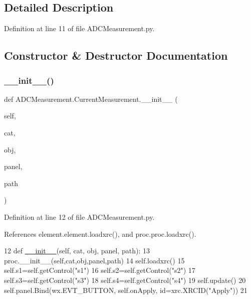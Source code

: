 \subsection{Detailed Description}


Definition at line 11 of file A\+D\+C\+Measurement.\+py.



\subsection{Constructor \& Destructor Documentation}
\mbox{\label{classADCMeasurement_1_1CurrentMeasurement_a0a2d0af1a969198d474d3f1fcd656d87}} 
\subsubsection{\texorpdfstring{\+\_\+\+\_\+init\+\_\+\+\_\+()}{\_\_init\_\_()}}
{\footnotesize\ttfamily def A\+D\+C\+Measurement.\+Current\+Measurement.\+\_\+\+\_\+init\+\_\+\+\_\+ (\begin{DoxyParamCaption}\item[{}]{self,  }\item[{}]{cat,  }\item[{}]{obj,  }\item[{}]{panel,  }\item[{}]{path }\end{DoxyParamCaption})}



Definition at line 12 of file A\+D\+C\+Measurement.\+py.



References element.\+element.\+loadxrc(), and proc.\+proc.\+loadxrc().


\begin{DoxyCode}
12     \textcolor{keyword}{def }\hyperlink{classwrapper_1_1ModuleDictWrapper_a9a7a794150502f51df687831583e13b9}{\_\_init\_\_}(self, cat, obj, panel, path):
13         proc.\_\_init\_\_(self,cat,obj,panel,path)
14         self.loadxrc()
15         self.s1=self.getControl(\textcolor{stringliteral}{"s1"})
16         self.s2=self.getControl(\textcolor{stringliteral}{"s2"})
17         self.s3=self.getControl(\textcolor{stringliteral}{"s3"})
18         self.s4=self.getControl(\textcolor{stringliteral}{"s4"})
19         self.update()
20         self.panel.Bind(wx.EVT\_BUTTON, self.onApply, id=xrc.XRCID(\textcolor{stringliteral}{"Apply"}))
21 
\end{DoxyCode}


